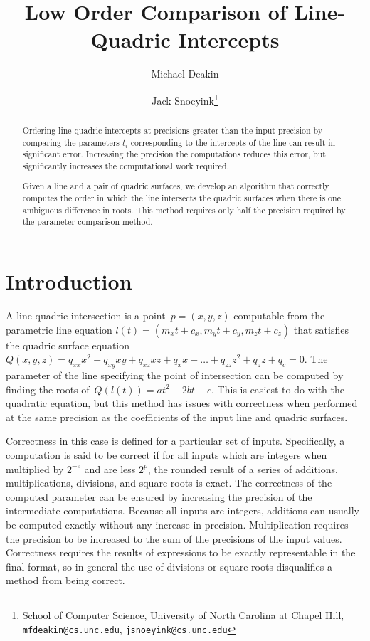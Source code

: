 \documentclass{cccg16}
\title{Low Order Comparison of Line-Quadric Intercepts}
\author{Michael Deakin \and Jack Snoeyink\thanks{School of Computer
    Science, University of North Carolina at Chapel Hill, {\tt
      mfdeakin@cs.unc.edu}, {\tt jsnoeyink@cs.unc.edu}}}
\begin{document}
\thispagestyle{empty}
\maketitle

\begin{abstract}
Ordering line-quadric intercepts at precisions greater than the input
precision by comparing the parameters $t_i$ corresponding to the
intercepts of the line can result in significant error.  Increasing
the precision the computations reduces this error, but significantly
increases the computational work required.

Given a line and a pair of quadric surfaces, we develop an algorithm
that correctly computes the order in which the line intersects the
quadric surfaces when there is one ambiguous difference in roots.
This method requires only half the precision required by the parameter
comparison method.
\end{abstract}

\section{Introduction}
A line-quadric intersection is a point~$p=(x, y, z)$ computable from
the parametric line equation $l(t)=(m_x t + c_x, m_y t + c_y, m_z t +
c_z)$ that satisfies the quadric surface equation~$Q(x, y, z)=q_{xx}
x^2 + q_{xy} xy + q_{xz} xz + q_x x + \dots + q_{zz} z^2 + q_{z} z +
q_c = 0$.  The parameter of the line specifying the point of
intersection can be computed by finding the roots of~$Q(l(t))=a t^2 -
2 b t + c$.  This is easiest to do with the quadratic equation, but
this method has issues with correctness when performed at the same
precision as the coefficients of the input line and quadric surfaces.

Correctness in this case is defined for a particular set of inputs.
Specifically, a computation is said to be correct if for all inputs
which are integers when multiplied by $2^{-e}$ and are less $2^p$, the
rounded result of a series of additions, multiplications, divisions,
and square roots is exact.  The correctness of the computed parameter
can be ensured by increasing the precision of the intermediate
computations.  Because all inputs are integers, additions can usually
be computed exactly without any increase in precision.  Multiplication
requires the precision to be increased to the sum of the precisions of
the input values.
Correctness requires the results of expressions to be exactly
representable in the final format, so in general the use of divisions
or square roots disqualifies a method from being correct.
\end{document}
